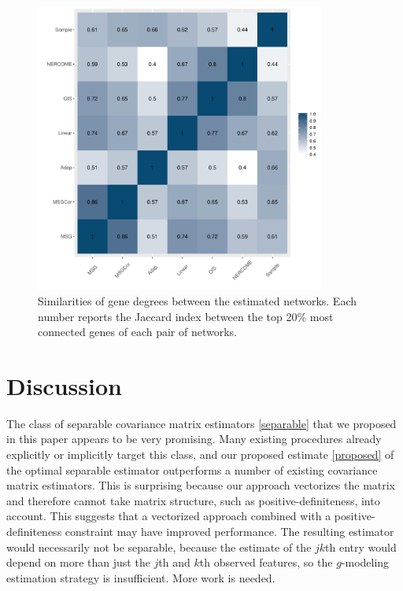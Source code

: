 \documentclass[useAMS,referee,usenatbib]{biom}
\begin{document}
\begin{figure}
\begin{center}
\centerline{\includegraphics[width=0.85\textwidth]{img/top20.pdf}}
\end{center}
\caption{Similarities of gene degrees between the estimated networks. Each number reports the Jaccard index between the top 20\% most connected genes of each pair of networks.}
\label{top20}
\end{figure}

\section{\label{sec:discussion}Discussion}
\label{discussion}

The class of separable covariance matrix estimators \ref{separable} that we proposed in this paper appears to be very promising. Many existing procedures already explicitly or implicitly target this class, and our proposed estimate \ref{proposed} of the optimal separable estimator outperforms a number of existing covariance matrix estimators. This is surprising because our approach vectorizes the matrix and therefore cannot take matrix structure, such as positive-definiteness, into account. This suggests that a vectorized approach combined with a positive-definiteness constraint may have improved performance. The resulting estimator would necessarily not be separable, because the estimate of the $jk$th entry would depend on more than just the $j$th and $k$th observed features, so the $g$-modeling estimation strategy is insufficient. More work is needed.
\end{document}
